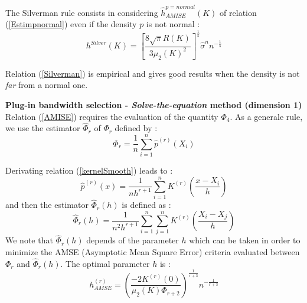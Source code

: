 {  The Silverman rule consists in considering $\hat{h}^{p = normal}_{AMISE}(K)$ of relation (\ref{Estimpnormal}) even if the density $p$ is not normal :
  \begin{equation}
    \label{Silverman}
    h^{Silver}(K) = \displaystyle \left[ \frac{8\sqrt{\pi} R(K)}{3\mu_2(K)^2}\right]^{\frac{1}{5}}\hat{\sigma}^n n^{-\frac{1}{5}}
  \end{equation}

  Relation (\ref{Silverman}) is empirical and gives good results when the density is not \emph{far} from a normal one.




  \vspace*{0.5cm}

  \textbf{Plug-in bandwidth selection - \emph{Solve-the-equation} method (dimension 1)}\\



  Relation (\ref{AMISE}) requires the evaluation of the quantity $\Phi_4$. As a generale rule, we use the estimator $\hat{\Phi}_r$ of $\Phi_r$ defined by :
  \begin{equation}
    \label{EstimPhir}
    \hat{\Phi}_r = \displaystyle \frac{1}{n}\sum_{i=1}^{n} \hat{p}^{(r)}(X_i)
  \end{equation}

  Derivating relation (\ref{kernelSmooth}) leads to :
  \begin{equation}
    \label{kernelSmoothDerivative}
    \hat{p}^{(r)}(x) = \displaystyle \frac{1}{nh^{r+1}}\sum_{i=1}^{n} K^{(r)}\left(\frac{x-X_i}{h}\right)
  \end{equation}
  and then the estimator $\hat{\Phi}_r(h)$ is defined as :
  \begin{equation}
    \label{EstimPhirFin}
    \hat{\Phi}_r(h) = \displaystyle \frac{1}{n^2h^{r+1}}\sum_{i=1}^{n}\sum_{j=1}^{n} K^{(r)}\left(\frac{X_i-X_j}{h}\right)
  \end{equation}
  We note that   $\hat{\Phi}_r(h)$ depends of the parameter $h$ which can be taken in order to minimize the AMSE (Asymptotic Mean  Square Error) criteria evaluated between $\Phi_r$ and  $\hat{\Phi}_r(h)$. The optimal parameter $h$ is :
  \begin{equation}
    \label{optimHamse}
    h^{(r)}_{AMSE} = \displaystyle \left(\frac{-2K^{(r)}(0)}{\mu_2(K)\Phi_{r+2}}\right)^{\frac{1}{r+3}}n^{-\frac{1}{r+3}}
  \end{equation}





}
